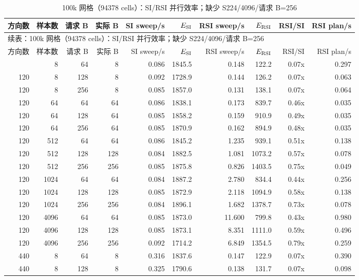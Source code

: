 {\tiny\setlength{\tabcolsep}{2.3pt}
\begin{longtable}{rrrrrrrrrr}
\caption{100k 网格（94378 cells）：SI/RSI 并行效率；缺少 S224/4096/请求 B=256}\label{tab:factor-efficiency-100k}\\
\toprule
方向数 & 样本数 & 请求 B & 实际 B & SI sweep/s & $E_{\rm SI}$ & RSI sweep/s & $E_{\rm RSI}$ & RSI/SI & RSI plan/s\\
\midrule
\endfirsthead
\multicolumn{10}{l}{\small 续表：100k 网格（94378 cells）：SI/RSI 并行效率；缺少 S224/4096/请求 B=256}\\
\toprule
方向数 & 样本数 & 请求 B & 实际 B & SI sweep/s & $E_{\rm SI}$ & RSI sweep/s & $E_{\rm RSI}$ & RSI/SI & RSI plan/s\\
\midrule
\endhead
\bottomrule
\endfoot
120 & 8 & 64 & 8 & 0.086 & 1845.5 & 0.148 & 122.2 & 0.07x & 0.297\\
120 & 8 & 128 & 8 & 0.092 & 1728.9 & 0.144 & 126.2 & 0.07x & 0.063\\
120 & 8 & 256 & 8 & 0.085 & 1857.0 & 0.131 & 138.1 & 0.07x & 0.064\\
120 & 64 & 64 & 64 & 0.086 & 1838.1 & 0.173 & 839.7 & 0.46x & 0.035\\
120 & 64 & 128 & 64 & 0.085 & 1858.2 & 0.159 & 910.9 & 0.49x & 0.035\\
120 & 64 & 256 & 64 & 0.085 & 1870.9 & 0.162 & 894.9 & 0.48x & 0.035\\
120 & 512 & 64 & 64 & 0.086 & 1845.2 & 1.235 & 939.1 & 0.51x & 0.138\\
120 & 512 & 128 & 128 & 0.084 & 1882.5 & 1.081 & 1073.2 & 0.57x & 0.078\\
120 & 512 & 256 & 256 & 0.085 & 1875.8 & 0.826 & 1403.5 & 0.75x & 0.049\\
120 & 1024 & 64 & 64 & 0.084 & 1887.2 & 2.780 & 834.4 & 0.44x & 0.256\\
120 & 1024 & 128 & 128 & 0.085 & 1872.9 & 2.118 & 1094.9 & 0.58x & 0.138\\
120 & 1024 & 256 & 256 & 0.084 & 1896.1 & 1.682 & 1378.7 & 0.73x & 0.078\\
120 & 4096 & 64 & 64 & 0.085 & 1873.0 & 11.600 & 799.8 & 0.43x & 0.980\\
120 & 4096 & 128 & 128 & 0.085 & 1873.1 & 8.351 & 1111.0 & 0.59x & 0.496\\
120 & 4096 & 256 & 256 & 0.092 & 1714.2 & 6.849 & 1354.5 & 0.79x & 0.259\\
440 & 8 & 64 & 8 & 0.316 & 1837.6 & 0.147 & 122.9 & 0.07x & 0.390\\
440 & 8 & 128 & 8 & 0.325 & 1790.6 & 0.138 & 131.7 & 0.07x & 0.098\\

\end{longtable}}
